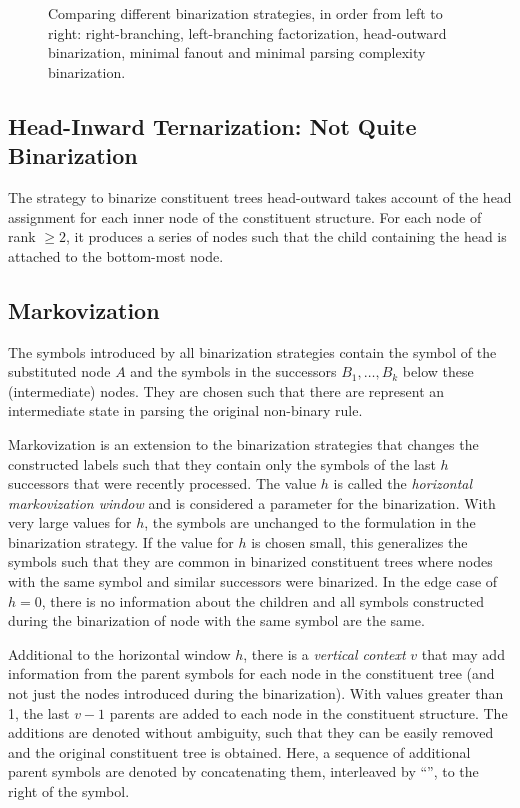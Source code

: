 \documentclass[../document.tex]{subfiles}
\begin{document}
    \begin{figure}
        \caption{\label{fig:ex:binarization}
            Comparing different binarization strategies, in order from left to right: right-branching, left-branching factorization, head-outward binarization, minimal fanout and minimal parsing complexity binarization.}
    \end{figure}

    \subsection{Head-Inward Ternarization: Not Quite Binarization} \label{sec:extraction:bin:hi}
    The strategy to binarize constituent trees head-outward takes account of the head assignment for each inner node of the constituent structure.
    For each node of rank \(\ge 2\), it produces a series of nodes such that the child containing the head is attached to the bottom-most node.



    \subsection{Markovization}
    The symbols introduced by all binarization strategies contain the symbol of the substituted node \(A\) and the symbols in the successors \(B_1, \ldots, B_k\) below these (intermediate) nodes.
    They are chosen such that there are represent an intermediate state in parsing the original non-binary rule.

    Markovization is an extension to the binarization strategies that changes the constructed labels such that they contain only the symbols of the last \(h\) successors that were recently processed.
    The value \(h\) is called the \emph{horizontal markovization window} and is considered a parameter for the binarization.
    With very large values for \(h\), the symbols are unchanged to the formulation in the binarization strategy.
    If the value for \(h\) is chosen small, this generalizes the symbols such that they are common in binarized constituent trees where nodes with the same symbol and similar successors were binarized.
    In the edge case of \(h=0\), there is no information about the children and all symbols constructed during the binarization of node with the same symbol are the same.

    Additional to the horizontal window \(h\), there is a \emph{vertical context} \(v\) that may add information from the parent symbols for each node in the constituent tree (and not just the nodes introduced during the binarization).
    With values greater than 1, the last \(v-1\) parents are added to each node in the constituent structure.
    The additions are denoted without ambiguity, such that they can be easily removed and the original constituent tree is obtained.
    Here, a sequence of additional parent symbols are denoted by concatenating them, interleaved by ``\cn{$\wedge$}'', to the right of the symbol.
\end{document}
